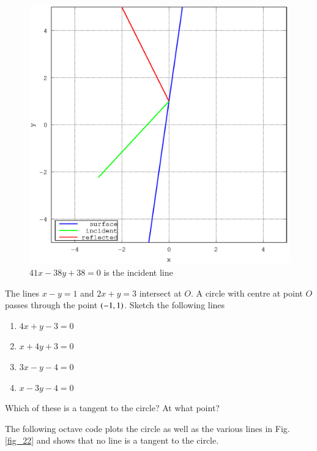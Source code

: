 \documentclass[journal,12pt,twocolumn]{IEEEtran}
\begin{document}
\begin{figure}[h]
\centering
\includegraphics[width=\columnwidth]{./figs/ee16b1021}
\caption{ $41x - 38y +38 = 0$ is the incident line}
\label{fig_21}	
\end{figure}
%
\begin{problem}
The lines $x-y=1$ and $2x+y=3$ intersect at $O$.  A circle with centre at point $O$ passes through the point $\left(-1,1\right)$. Sketch the following lines
\begin{enumerate}
\item $4x +y -3 = 0$
\item $x + 4y+3 = 0$
\item $3x - y  - 4 = 0$
\item $x - 3y - 4 = 0$
\end{enumerate}
Which of these is a tangent to the circle? At what point?
\end{problem}
\solution

%
The following octave code plots the circle as well as the various lines  in Fig. \ref{fig_22} and shows that no  line is a tangent to the circle.

%
\end{document}
